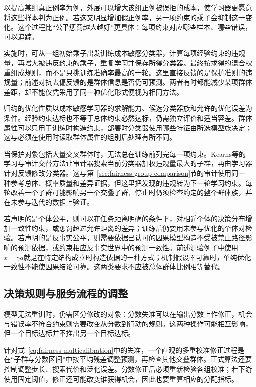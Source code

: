 以提高某组真正例率为例，外层可以增大该组正例被误拒的成本，使学习器更愿意将这些样本判为正例。若这又明显增加假正例率，另一项约束的乘子会抑制这一变化。这个过程比“公平惩罚越大越好”更具体：每项约束对应哪些样本、哪些错误，可以追踪。

实施时，可从一组初始乘子出发训练成本敏感分类器，计算每项经验约束的违规量，再增大被违反约束的乘子，重复学习并保存所得分类器。最终按求得的混合权重组成规则，而不是只挑训练准确率最高的一轮。这里直接反馈的是保护准则的违规量；前述对抗去偏反馈的是群体信息是否仍可预测。两者有时都能减少某项群体差距，却不能仅凭采用了同一种优化形式便视为相同方法。

归约的优化性质以成本敏感学习器的求解能力、候选分类器族和允许的优化误差为条件。经验约束达标也不等于总体约束必然达标，仍需独立评价和适当容差。群体属性可以只用于训练时构造约束，部署时分类器使用哪些特征由所选模型族决定；这与必须在使用时读取群体属性的组别后处理有所不同。

当保护对象包括大量交叉群体时，无法总在训练前列完每一项约束。Kearns等的学习与审计交替方法让审计器搜索当前分类器加权违规量最大的子群，再由学习器针对反馈修改分类器。这与第~\ref{sec:fairness-group-comparison}节的审计使用同一种参考总体、概率质量和差异证据，但这里把发现的违规转为下一轮学习约束。每轮改善一个子群可能影响另一个交叠子群，停止时仍须检查约定的整个群体族，并在未参与迭代的数据上验证。

若声明的是个体公平，则可以在任务距离明确的条件下，对相近个体的决策分布增加一致性约束，或惩罚超过允许距离的差异；训练后仍要用未参与优化的个体对检验。若声明的是反事实公平，则需要依据已认可的因果模型构造不受被禁止路径影响的预测依据，或约束相应反事实世界中的预测一致性。前述测验例子中使用$x-\gamma a$就是在特定结构成立时构造依据的一种方式；机制假设不可靠时，单纯优化一致性不能使因果结论可靠。这两类要求不应被总体群体比例相等替代。

\subsection{决策规则与服务流程的调整}
\label{sec:fairness-decision-intervention}

模型无法重训时，仍需区分修改的对象：分数失准可以在输出分数上作修正，机会与错误率不符合约束则需要改变从分数到行动的规则。这两种操作可能相互影响，但一个目标达标并不推出另一个目标达标。

针对式~\eqref{eq:fairness-multicalibration}中的失准，一个直观的多重校准修正过程是在“子群与分数区间”中按平均残差调整预测，再检查其他交叠群体。正式算法还要控制调整步长、搜索代价和泛化误差。分数修正后必须重新检验各组校准；若下游使用固定阈值，修正还可能改变谁获得机会，因此也要重算相应的分配指标。

